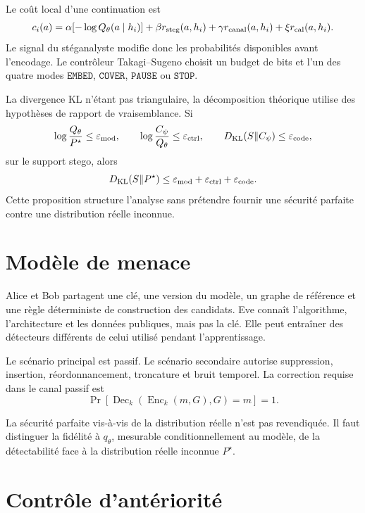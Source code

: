\documentclass[11pt,a4paper]{article}
\begin{document}
Le coût local d'une continuation est
\[
c_i(a)=
\alpha[-\log Q_\theta(a\mid h_i)]
+\beta r_{\rm steg}(a,h_i)
+\gamma r_{\rm canal}(a,h_i)
+\xi r_{\rm cal}(a,h_i).
\]
Le signal du stéganalyste modifie donc les probabilités disponibles avant
l'encodage. Le contrôleur Takagi--Sugeno choisit un budget de bits et l'un des
quatre modes \(\mathtt{EMBED}\), \(\mathtt{COVER}\), \(\mathtt{PAUSE}\) ou
\(\mathtt{STOP}\).

La divergence KL n'étant pas triangulaire, la décomposition théorique utilise
des hypothèses de rapport de vraisemblance. Si
\[
\log\frac{Q_\theta}{P^\star}\leq\varepsilon_{\rm mod},\qquad
\log\frac{C_\psi}{Q_\theta}\leq\varepsilon_{\rm ctrl},\qquad
D_{\rm KL}(S\Vert C_\psi)\leq\varepsilon_{\rm code},
\]
sur le support stego, alors
\[
D_{\rm KL}(S\Vert P^\star)
\leq\varepsilon_{\rm mod}
+\varepsilon_{\rm ctrl}
+\varepsilon_{\rm code}.
\]
Cette proposition structure l'analyse sans prétendre fournir une sécurité
parfaite contre une distribution réelle inconnue.

\section{Modèle de menace}

Alice et Bob partagent une clé, une version du modèle, un graphe de référence
et une règle déterministe de construction des candidats. Eve connaît
l'algorithme, l'architecture et les données publiques, mais pas la clé. Elle
peut entraîner des détecteurs différents de celui utilisé pendant
l'apprentissage.

Le scénario principal est passif. Le scénario secondaire autorise suppression,
insertion, réordonnancement, troncature et bruit temporel. La correction
requise dans le canal passif est
\[
\Pr[\operatorname{Dec}_k(\operatorname{Enc}_k(m,G),G)=m]=1.
\]

La sécurité parfaite vis-à-vis de la distribution réelle n'est pas
revendiquée. Il faut distinguer la fidélité à \(q_\theta\), mesurable
conditionnellement au modèle, de la détectabilité face à la distribution
réelle inconnue \(P^\star\).

\section{Contrôle d'antériorité}
\end{document}
